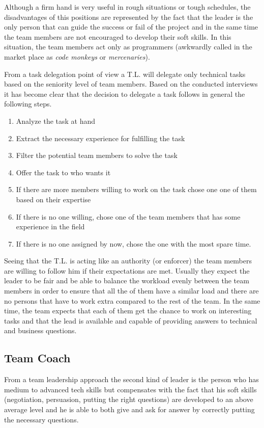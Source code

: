Although a firm hand is very useful in rough situations or tough schedules, the disadvantages of this positions are represented by the fact that the leader is the only person that can guide the success or fail of the project and in the same time the team members are not encouraged to develop their soft skills. In this situation, the team members act only as programmers (awkwardly called in the market place as \textit{code monkeys} or \textit{mercenaries}).

From a task delegation point of view a T.L. will delegate only technical tasks based on the seniority level of team members. Based on the conducted interviews it has become clear that the decision to delegate a task follows in general the following steps.
\begin{enumerate}
\item Analyze the task at hand
\item Extract the necessary experience for fulfilling the task
\item Filter the potential team members to solve the task
\item Offer the task to who wants it
\item If there are more members willing to work on the task chose one one of them based on their expertise
\item If there is no one willing, chose one of the team members that has some experience in the field
\item If there is no one assigned by now, chose the one with the most spare time.
\end{enumerate}

Seeing that the T.L. is acting like an authority (or enforcer) the team members are willing to follow him if their expectations are met. Usually they expect the leader to be fair and be able to balance the workload evenly between the team members in order to ensure that all the of them have a similar load and there are no persons that have to work extra compared to the rest of the team. In the same time, the team expects that each of them get the chance to work on interesting tasks and that the lead is available and capable of providing answers to technical and business questions.

\subsection{Team Coach}
\label{sub-sec:team-coach}
From a team leadership approach the second kind of leader is the person who has medium to advanced tech skills but compensates with the fact that his soft skills (negotiation, persuasion, putting the right questions) are developed to an above average level and he is able to both give and ask for answer by correctly putting the necessary questions.

